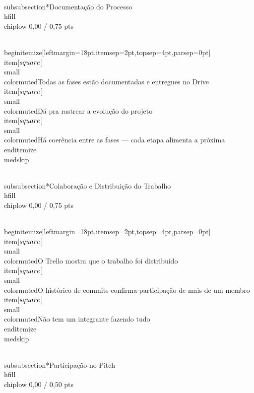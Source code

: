 \documentclass[11pt, a4paper]{article}
\newcommand{\chiplow}[1]{\colorbox{crimsondim}{\color{crimson}\semibold\small\strut\ #1\ }}
\begin{document}
\\subsubsection*{Documentação do Processo \\hfill {\\chiplow 0,00 / 0,75 pts}}

\\begin{itemize}[leftmargin=18pt,itemsep=2pt,topsep=4pt,parsep=0pt]
  \\item[$\\square$] {\\small\\color{muted}Todas as fases estão documentadas e entregues no Drive}
  \\item[$\\square$] {\\small\\color{muted}Dá pra rastrear a evolução do projeto}
  \\item[$\\square$] {\\small\\color{muted}Há coerência entre as fases — cada etapa alimenta a próxima}
\\end{itemize}
\\medskip

\\subsubsection*{Colaboração e Distribuição do Trabalho \\hfill {\\chiplow 0,00 / 0,75 pts}}

\\begin{itemize}[leftmargin=18pt,itemsep=2pt,topsep=4pt,parsep=0pt]
  \\item[$\\square$] {\\small\\color{muted}O Trello mostra que o trabalho foi distribuído}
  \\item[$\\square$] {\\small\\color{muted}O histórico de commits confirma participação de mais de um membro}
  \\item[$\\square$] {\\small\\color{muted}Não tem um integrante fazendo tudo}
\\end{itemize}
\\medskip

\\subsubsection*{Participação no Pitch \\hfill {\\chiplow 0,00 / 0,50 pts}}
\end{document}
